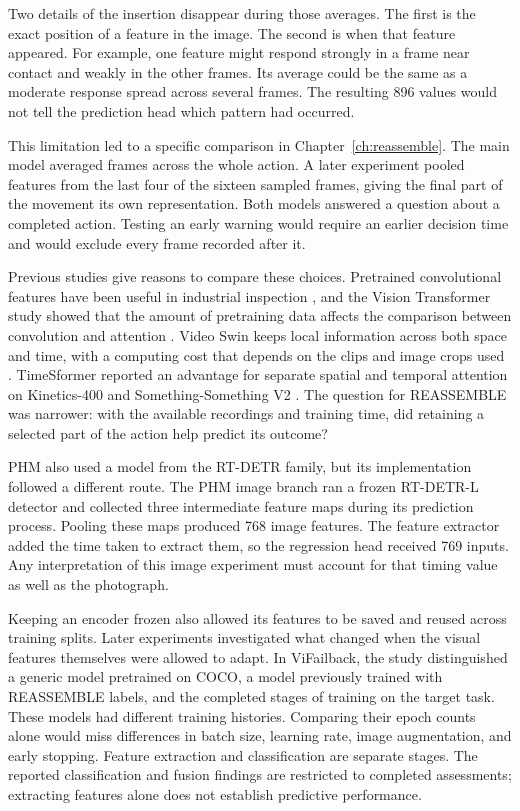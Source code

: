 Two details of the insertion disappear during those averages. The first is the exact
position of a feature in the image. The second is when that feature appeared. For
example, one feature might respond strongly in a frame near contact and weakly in the
other frames. Its average could be the same as a moderate response spread across several
frames. The resulting 896 values would not tell the prediction head which pattern had
occurred.

This limitation led to a specific comparison in Chapter~\ref{ch:reassemble}. The main model averaged
frames across the whole action. A later experiment pooled features from the last four of
the sixteen sampled frames, giving the final part of the movement its own
representation. Both models answered a question about a completed action. Testing an
early warning would require an earlier decision time and would exclude every frame
recorded after it.

Previous studies give reasons to compare these choices. Pretrained convolutional
features have been useful in industrial inspection \parencite{Roth2022Towards}, and the
Vision Transformer study showed that the amount of pretraining data affects the
comparison between convolution and attention \parencite{P010}. Video Swin keeps local
information across both space and time, with a computing cost that depends on the clips
and image crops used \parencite{P013}. TimeSformer reported an advantage for separate
spatial and temporal attention on Kinetics-400 and Something-Something V2
\parencite[Table~1]{P034}. The question for REASSEMBLE was narrower: with the available
recordings and training time, did retaining a selected part of the action help predict
its outcome?

PHM also used a model from the RT-DETR family, but its implementation followed a
different route. The PHM image branch ran a frozen RT-DETR-L detector and collected three
intermediate feature maps during its prediction process. Pooling these maps produced 768
image features. The feature extractor added the time taken to extract them, so the regression
head received 769 inputs. Any interpretation of this image experiment must
account for that timing value as well as the photograph.

Keeping an encoder frozen also allowed its features to be saved and reused across
training splits. Later experiments investigated what changed when the visual features
themselves were allowed to adapt. In ViFailback, the study distinguished a generic model
pretrained on COCO, a model previously trained with REASSEMBLE labels, and the completed
stages of training on the target task. These models had different training histories.
Comparing their epoch counts alone would miss differences in batch size, learning rate,
image augmentation, and early stopping. Feature extraction and classification are separate stages. The reported classification
and fusion findings are restricted to completed assessments; extracting features alone
does not establish predictive performance.

